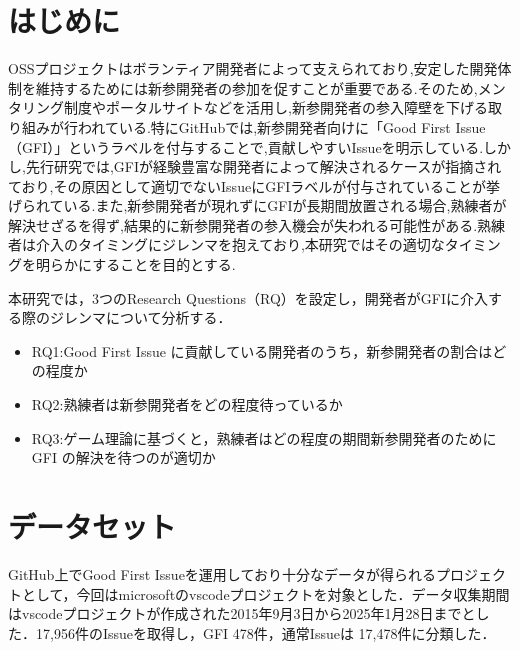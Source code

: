 \documentclass[twocolumn]{jarticle} %
\newcommand{\RQOne}{Good First Issue に貢献している開発者のうち，新参開発者の割合はどの程度か}
\newcommand{\RQTwo}{熟練者は新参開発者をどの程度待っているか}
\newcommand{\RQThree}{ゲーム理論に基づくと，熟練者はどの程度の期間新参開発者のために GFI の解決を待つのが適切か}
\newcommand{\NTrueIssue}{17,956}
\newcommand{\NGFI}{478}
\newcommand{\NNormal}{17,478}
\begin{document}
\maketitle
\thispagestyle{empty} %



\section{はじめに}\label{sec:intro}

OSSプロジェクトはボランティア開発者によって支えられており,安定した開発体制を維持するためには新参開発者の参加を促すことが重要である.そのため,メンタリング制度\cite{menter1}やポータルサイト\cite{portal}などを活用し,新参開発者の参入障壁を下げる取り組みが行われている.特にGitHubでは,新参開発者向けに「Good First Issue（GFI）」というラベルを付与することで,貢献しやすいIssueを明示している.しかし,先行研究\cite{GFI}では,GFIが経験豊富な開発者によって解決されるケースが指摘されており,その原因として適切でないIssueにGFIラベルが付与されていることが挙げられている.また,新参開発者が現れずにGFIが長期間放置される場合,熟練者が解決せざるを得ず,結果的に新参開発者の参入機会が失われる可能性がある.熟練者は介入のタイミングにジレンマを抱えており,本研究ではその適切なタイミングを明らかにすることを目的とする.

本研究では，3つのResearch Questions（RQ）を設定し，開発者がGFIに介入する際のジレンマについて分析する．

\begin{itemize}
\item RQ1:\RQOne
\item RQ2:\RQTwo
\item RQ3:\RQThree
\end{itemize}

\section{データセット}\label{sec:rq1}

GitHub上でGood First Issueを運用しており十分なデータが得られるプロジェクトとして，今回はmicrosoftのvscodeプロジェクトを対象とした．データ収集期間はvscodeプロジェクトが作成された2015年9月3日から2025年1月28日までとした．\NTrueIssue 件のIssueを取得し，GFI \NGFI 件，通常Issueは \NNormal 件に分類した．
\end{document}
